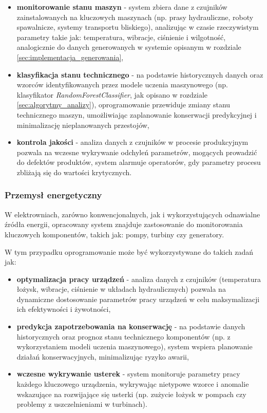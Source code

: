 \begin{itemize}
    \item \textbf{monitorowanie stanu maszyn} - system zbiera dane z czujników zainstalowanych na kluczowych maszynach (np. prasy hydrauliczne, roboty spawalnicze, systemy transportu bliskiego),
    analizując w czasie rzeczywistym parametry takie jak: temperatura, wibracje, ciśnienie i wilgotność, analogicznie do danych generowanych w systemie opisanym w rozdziale \ref{sec:implementacja_generowania},
    \item \textbf{klasyfikacja stanu technicznego} - na podstawie historycznych danych oraz wzorców identyfikowanych przez modele uczenia maszynowego (np. klasyfikator \textit{RandomForestClassifier}, jak opisano w rozdziale \ref{sec:algorytmy_analizy}), oprogramowanie przewiduje zmiany stanu technicznego maszyn,
    umożliwiając zaplanowanie konserwacji predykcyjnej i minimalizację nieplanowanych przestojów,
    \item \textbf{kontrola jakości} - analiza danych z czujników w procesie produkcyjnym pozwala na wczesne wykrywanie odchyleń parametrów, mogących prowadzić do defektów
    produktów, system alarmuje operatorów, gdy parametry procesu zbliżają się do wartości krytycznych.
\end{itemize}

\subsubsection{Przemysł energetyczny}
\label{subsubsec:przemysl_energetyczny}

W elektrowniach, zarówno konwencjonalnych, jak i wykorzystujących odnawialne źródła energii, opracowany system znajduje zastosowanie do monitorowania kluczowych komponentów, takich jak: pompy, turbiny czy generatory. 

\vspace{0.3em}

W tym przypadku oprogramowanie może być wykorzystywane do takich zadań jak:

\begin{itemize}
    \item \textbf{optymalizacja pracy urządzeń} - analiza danych z czujników (temperatura łożysk, wibracje, ciśnienie w układach hydraulicznych) pozwala na dynamiczne dostosowanie parametrów pracy urządzeń w celu maksymalizacji ich efektywności i żywotności,
    \item \textbf{predykcja zapotrzebowania na konserwację} - na podstawie danych historycznych oraz prognoz stanu technicznego komponentów (np. z wykorzystaniem modeli uczenia maszynowego), system wspiera planowanie działań konserwacyjnych, minimalizując ryzyko awarii,
    \item \textbf{wczesne wykrywanie usterek} - system monitoruje parametry pracy każdego kluczowego urządzenia, wykrywając nietypowe wzorce i anomalie wskazujące na rozwijające się usterki (np. zużycie łożysk w pompach czy problemy z uszczelnieniami w turbinach).
\end{itemize}

